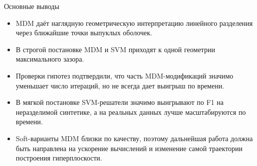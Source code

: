 \SPBGContentSlide
  {Основные выводы}
  {%
    \Body
    \begin{itemize}
      \item MDM даёт наглядную геометрическую интерпретацию линейного разделения
      через ближайшие точки выпуклых оболочек.
      \item В строгой постановке MDM и SVM приходят к одной геометрии
      максимального зазора.
      \item Проверки гипотез подтвердили, что часть MDM-модификаций значимо
      уменьшает число итераций, но не всегда дает выигрыш по времени.
      \item В мягкой постановке SVM-решатели значимо выигрывают по F1 на
      неразделимой синтетике, а на реальных данных лучше масштабируются по
      времени.
      \item Soft-варианты MDM близки по качеству, поэтому дальнейшая работа
      должна быть направлена на ускорение вычислений и изменение самой
      траектории построения гиперплоскости.
    \end{itemize}
  }
